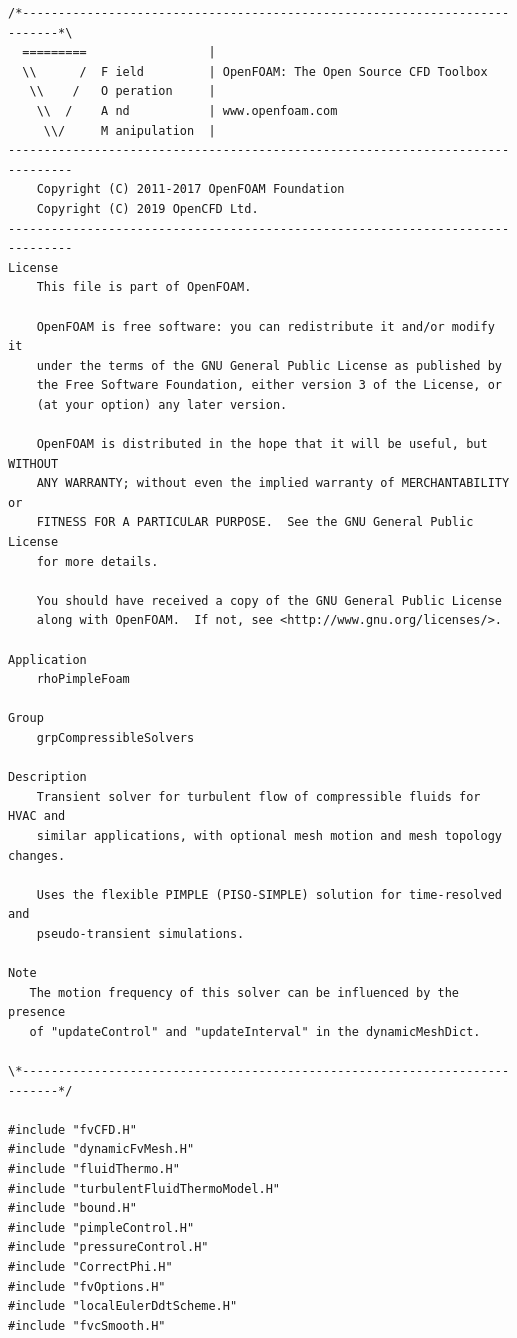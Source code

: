 \documentclass[masters]{ucbthesis}
\renewcommand{\_}{\kern-1.5pt\textunderscore\kern-1.5pt}
\begin{document}
\begin{lstlisting}[caption=rhoPimpleFoam.C, label={lst:rhoPimpleFoam}]
/*---------------------------------------------------------------------------*\
  =========                 |
  \\      /  F ield         | OpenFOAM: The Open Source CFD Toolbox
   \\    /   O peration     |
    \\  /    A nd           | www.openfoam.com
     \\/     M anipulation  |
-------------------------------------------------------------------------------
    Copyright (C) 2011-2017 OpenFOAM Foundation
    Copyright (C) 2019 OpenCFD Ltd.
-------------------------------------------------------------------------------
License
    This file is part of OpenFOAM.

    OpenFOAM is free software: you can redistribute it and/or modify it
    under the terms of the GNU General Public License as published by
    the Free Software Foundation, either version 3 of the License, or
    (at your option) any later version.

    OpenFOAM is distributed in the hope that it will be useful, but WITHOUT
    ANY WARRANTY; without even the implied warranty of MERCHANTABILITY or
    FITNESS FOR A PARTICULAR PURPOSE.  See the GNU General Public License
    for more details.

    You should have received a copy of the GNU General Public License
    along with OpenFOAM.  If not, see <http://www.gnu.org/licenses/>.

Application
    rhoPimpleFoam

Group
    grpCompressibleSolvers

Description
    Transient solver for turbulent flow of compressible fluids for HVAC and
    similar applications, with optional mesh motion and mesh topology changes.

    Uses the flexible PIMPLE (PISO-SIMPLE) solution for time-resolved and
    pseudo-transient simulations.

Note
   The motion frequency of this solver can be influenced by the presence
   of "updateControl" and "updateInterval" in the dynamicMeshDict.

\*---------------------------------------------------------------------------*/

#include "fvCFD.H"
#include "dynamicFvMesh.H"
#include "fluidThermo.H"
#include "turbulentFluidThermoModel.H"
#include "bound.H"
#include "pimpleControl.H"
#include "pressureControl.H"
#include "CorrectPhi.H"
#include "fvOptions.H"
#include "localEulerDdtScheme.H"
#include "fvcSmooth.H"


\end{lstlisting}
\end{document}
